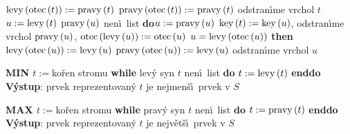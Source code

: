 \phantom{---------}$\operatorname{levy}\left(\operatorname{otec}\left(t\right)\right):=\operatorname{pravy}\left(t\right)$\newline 
\phantom{------}{\bf else}\newline 
\phantom{---------}$\operatorname{pravy}\left(\operatorname{otec}\left(t\right)\right):=\operatorname{pravy}\left(t\right)$\newline 
\phantom{------}{\bf endif\newline}
\phantom{------}odstran\'\i me vrchol $t$\newline 
\phantom{---}{\bf else}\newline 
\phantom{------}$u:=\operatorname{levy}\left(t\right)$\newline 
\phantom{------}{\bf while} $\operatorname{pravy}\left(u\right)$ nen\'\i\ list {\bf do}\newline \phantom{---------}$u:=\operatorname{pravy}\left(u\right)$\newline 
\phantom{------}{\bf enddo}\newline 
\phantom{------}$\operatorname{key}\left(t\right):=\operatorname{key}\left(u\right)$, odstran\'\i me vrchol $\operatorname{pravy}\left(u\right)$,\newline 
\phantom{------}$\operatorname{otec}\left(\operatorname{levy}\left(u\right)\right):=\operatorname{otec}\left(u\right)$\newline 
\phantom{------}{\bf if} $u=\operatorname{levy}\left(\operatorname{otec}\left(u\right)\right)$ {\bf then}\newline 
\phantom{---------}$\operatorname{levy}\left(\operatorname{otec}\left(u\right)\right):=\operatorname{levy}\left(u\right)$\newline 
\phantom{------}{\bf else}\newline 
\phantom{---------}$\operatorname{pravy}\left(\operatorname{otec}\left(u\right)\right):=\operatorname{levy}\left(u\right)$\newline 
\phantom{------}{\bf endif\newline}
\phantom{------}odstran\'\i me vrchol $u$\newline 
\phantom{---}{\bf endif\newline 
endif}
\medskip

{\bf MIN\newline 
$t:=$}ko\v ren stromu\newline 
{\bf while} lev\'y syn $t$ nen\'\i\ list {\bf do} $t:=\operatorname{levy}\left(t\right)$ {\bf enddo\newline 
V\'ystup}: prvek reprezentovan\'y $t$ je nejmen\v s\'\i\ prvek v $
S$
\medskip

{\bf MAX\newline 
$t:=$}ko\v ren stromu\newline 
{\bf while} prav\'y syn $t$ nen\'\i\ list {\bf do} $t:=\operatorname{pravy}\left(t\right)$ {\bf enddo\newline 
V\'ystup}: prvek reprezentovan\'y $t$ je nejv\v et\v s\'\i\ prvek v $
S$
\medskip


